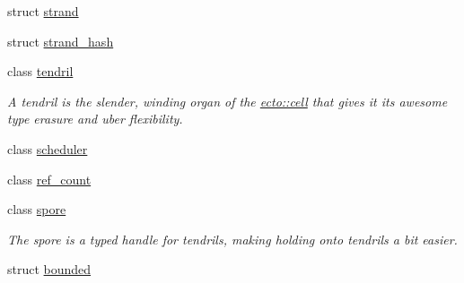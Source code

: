 \begin{DoxyCompactItemize}
struct \hyperlink{structecto_1_1strand}{strand}
\item 
struct \hyperlink{structecto_1_1strand__hash}{strand\-\_\-hash}
\item 
class \hyperlink{classecto_1_1tendril}{tendril}
\begin{DoxyCompactList}\small\item\em A tendril is the slender, winding organ of the \hyperlink{structecto_1_1cell}{ecto\-::cell} that gives it its awesome type erasure and uber flexibility. \end{DoxyCompactList}\item 
class \hyperlink{classecto_1_1scheduler}{scheduler}
\item 
class \hyperlink{classecto_1_1ref__count}{ref\-\_\-count}
\item 
class \hyperlink{structecto_1_1spore}{spore}
\begin{DoxyCompactList}\small\item\em The spore is a typed handle for tendrils, making holding onto tendrils a bit easier. \end{DoxyCompactList}\item 
struct \hyperlink{structecto_1_1bounded}{bounded}
\end{DoxyCompactItemize}
